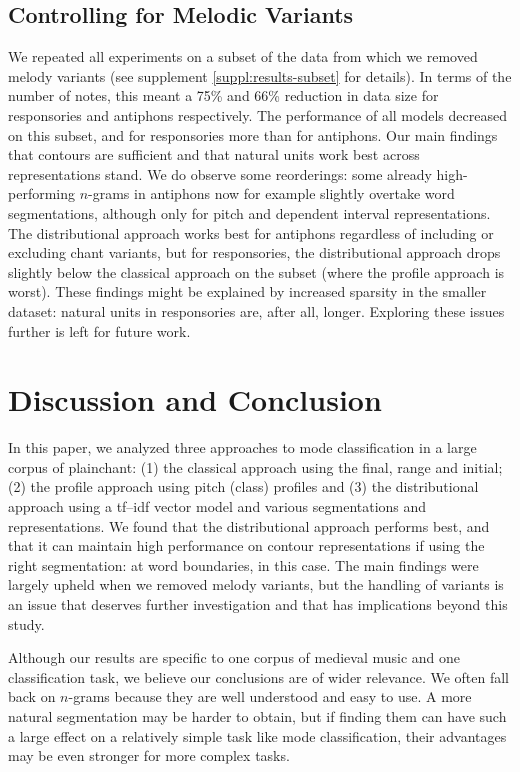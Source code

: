 \documentclass{article}
\begin{document}
\subsection{Controlling for Melodic Variants}\label{sec:melodic-variants}

We repeated all experiments on a subset of the data from which we removed melody variants (see supplement \ref{suppl:results-subset} for details).
In terms of the number of notes, this meant a 75\% and 66\% reduction in data size for responsories and antiphons respectively.
The performance of all models decreased on this subset, and for responsories more than for antiphons.
Our main findings that contours are sufficient and that natural units work best across representations stand.
We do observe some reorderings: some already high-performing $n$-grams in antiphons now for example slightly overtake word segmentations, although only for pitch and dependent interval representations.
The distributional approach works best for antiphons regardless of including or excluding chant variants, but for responsories, the distributional approach drops slightly below the classical approach on the subset (where the profile approach is worst).
These findings might be explained by increased sparsity in the smaller dataset: natural units in responsories are, after all, longer.
Exploring these issues further is left for future work.



\section{Discussion and Conclusion}


In this paper, we analyzed three approaches to mode classification in a large corpus of plainchant: (1) the classical approach using the final, range and initial; (2) the profile approach using pitch (class) profiles and (3) the distributional approach using a tf--idf vector model and various segmentations and representations.
We found that the distributional approach performs best, and that it can maintain high performance on contour representations if using the right segmentation: at word boundaries, in this case.
The main findings were largely upheld when we removed melody variants, but the handling of variants is an issue that deserves further investigation and that has implications beyond this study.

Although our results are specific to one corpus of medieval music and one classification task, we believe our conclusions are of wider relevance. 
We often fall back on $n$-grams because they are well understood and easy to use. A more natural segmentation may be harder to obtain, but if finding them can have such a large effect on a relatively simple task like mode classification, their advantages may be even stronger for more complex tasks. 
\end{document}
